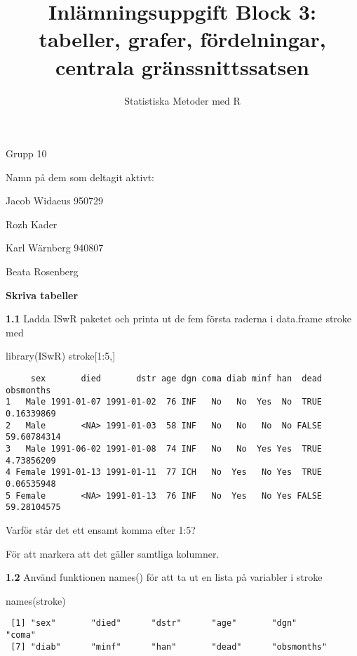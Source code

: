 \documentclass[
  letterpaper,
  DIV=11,
  numbers=noendperiod]{scrartcl}
\title{Inlämningsuppgift Block 3: tabeller, grafer, fördelningar,
centrala gränssnittssatsen}
\author{Statistiska Metoder med R}
\date{}
\newenvironment{Shaded}{\begin{snugshade}}{\end{snugshade}}
\newcommand{\DecValTok}[1]{\textcolor[rgb]{0.68,0.00,0.00}{#1}}
\newcommand{\FunctionTok}[1]{\textcolor[rgb]{0.28,0.35,0.67}{#1}}
\newcommand{\NormalTok}[1]{\textcolor[rgb]{0.00,0.23,0.31}{#1}}
\newcommand{\SpecialCharTok}[1]{\textcolor[rgb]{0.37,0.37,0.37}{#1}}
\begin{document}
\maketitle

Grupp 10

Namn på dem som deltagit aktivt:

Jacob Widaeus 950729

Rozh Kader

Karl Wärnberg 940807

Beata Rosenberg

\hfill\break

\hfill\break

\textbf{Skriva tabeller}

\textbf{1.1} Ladda ISwR paketet och printa ut de fem första raderna i
data.frame stroke med

\begin{Shaded}
\begin{Highlighting}[]
\FunctionTok{library}\NormalTok{(ISwR)}
\NormalTok{stroke[}\DecValTok{1}\SpecialCharTok{:}\DecValTok{5}\NormalTok{,]}
\end{Highlighting}
\end{Shaded}

\begin{verbatim}
     sex       died       dstr age dgn coma diab minf han  dead   obsmonths
1   Male 1991-01-07 1991-01-02  76 INF   No   No  Yes  No  TRUE  0.16339869
2   Male       <NA> 1991-01-03  58 INF   No   No   No  No FALSE 59.60784314
3   Male 1991-06-02 1991-01-08  74 INF   No   No  Yes Yes  TRUE  4.73856209
4 Female 1991-01-13 1991-01-11  77 ICH   No  Yes   No Yes  TRUE  0.06535948
5 Female       <NA> 1991-01-13  76 INF   No  Yes   No Yes FALSE 59.28104575
\end{verbatim}

Varför står det ett ensamt komma efter 1:5?

För att markera att det gäller samtliga kolumner.

\textbf{1.2} Använd funktionen names() för att ta ut en lista på
variabler i stroke

\begin{Shaded}
\begin{Highlighting}[]
\FunctionTok{names}\NormalTok{(stroke)}
\end{Highlighting}
\end{Shaded}

\begin{verbatim}
 [1] "sex"       "died"      "dstr"      "age"       "dgn"       "coma"     
 [7] "diab"      "minf"      "han"       "dead"      "obsmonths"
\end{verbatim}
\end{document}
